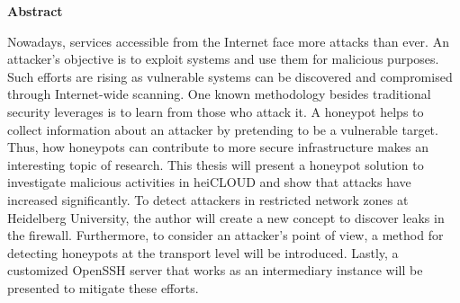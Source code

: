 \thispagestyle{empty}
\begin{center}
    \begin{minipage}[c][0.48\textheight][b]{0.9\textwidth}
        \small
        \begin{center}
            \textbf{Abstract}
        \end{center}\par
        \vspace{\baselineskip}
        Nowadays, services accessible from the Internet face more attacks than ever.
        An attacker's objective is to exploit systems and use them for malicious purposes.
        Such efforts are rising as vulnerable systems can be discovered and compromised through Internet-wide scanning.
        One known methodology besides traditional security leverages is to learn from those who attack it.
        A honeypot helps to collect information about an attacker by pretending to be a vulnerable target.
        Thus, how honeypots can contribute to more secure infrastructure makes an interesting topic of research.
        This thesis will present a honeypot solution to investigate malicious activities in heiCLOUD and show that attacks have increased significantly.
        To detect attackers in restricted network zones at Heidelberg University, the author will create a new concept to discover leaks in the firewall.
        Furthermore, to consider an attacker's point of view, a method for detecting honeypots at the transport level will be introduced.
        Lastly, a customized OpenSSH server that works as an intermediary instance will be presented to mitigate these efforts.
        \end{minipage}\par
    \vfill
\end{center}
